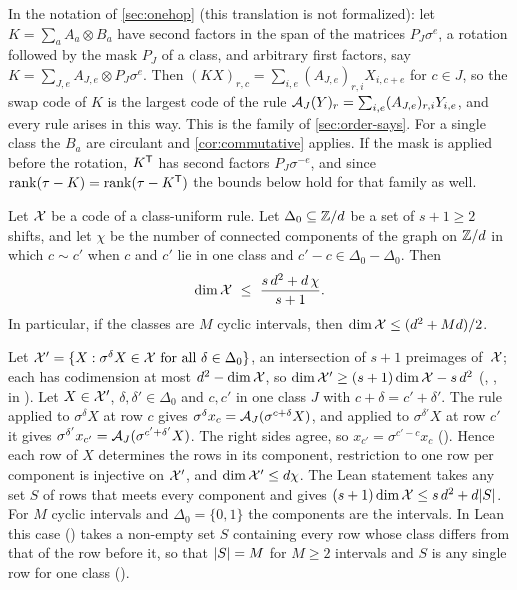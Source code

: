 In the notation of \cref{sec:onehop} (this translation is not formalized): let $K=\sum_aA_a\otimes B_a$ have second
factors in the span of the matrices $P_J\sigma^e$, a rotation followed by the mask $P_J$ of a class, and arbitrary first
factors, say $K=\sum_{J,e}A_{J,e}\otimes P_J\sigma^e$. Then $(KX)_{r,c}=\sum_{i,e}(A_{J,e})_{r,i}X_{i,c+e}$ for $c\in J$,
so the swap code of $K$ is the largest code of the rule $\mathcal{A}_J(Y)_r=\sum_{i,e}(A_{J,e})_{r,i}Y_{i,e}$, and every rule
arises in this way. This is the family of \cref{sec:order-says}. For a single class the $B_a$ are circulant and
\cref{cor:commutative} applies. If the mask is applied before the rotation, $K^{\mathsf{T}}$ has second factors
$P_J\sigma^{-e}$, and since $\operatorname{rank}(\tau-K)=\operatorname{rank}(\tau-K^{\mathsf{T}})$ the bounds below hold for that family as well.

\begin{theorem}\label{thm:TP}
Let $\mathcal{X}$ be a code of a class-uniform rule. Let $\Delta_0\subseteq\mathbb{Z}/d$ be a set of $s+1\ge2$ shifts, and let $\chi$
be the number of connected components of the graph on $\mathbb{Z}/d$ in which $c\sim c'$ when $c$ and $c'$ lie in one class and
$c'-c\in\Delta_0-\Delta_0$. Then
\[
  \dim\X\ \le\ \frac{s\,d^2+d\,\chi}{s+1}.
\]
In particular, if the classes are $M$ cyclic intervals, then $\dim\mathcal{X}\le(d^2+Md)/2$.
\end{theorem}

\begin{outline}
Let $\mathcal{X}'=\{X:\sigma^\delta X\in\mathcal{X}\text{ for all }\delta\in\Delta_0\}$, an intersection of $s+1$ preimages of~$\mathcal{X}$;
each has codimension at most $d^2-\dim\mathcal{X}$, so $\dim\mathcal{X}'\ge(s+1)\dim\mathcal{X}-s\,d^2$
(, , in
). Let $X\in\mathcal{X}'$, $\delta,\delta'\in\Delta_0$ and $c,c'$ in one class $J$
with $c+\delta=c'+\delta'$. The rule applied to $\sigma^\delta X$ at row $c$ gives
$\sigma^\delta x_c=\mathcal{A}_J(\sigma^{c+\delta}X)$, and applied to $\sigma^{\delta'}X$ at row $c'$ it gives
$\sigma^{\delta'}x_{c'}=\mathcal{A}_J(\sigma^{c'+\delta'}X)$. The right sides agree, so $x_{c'}=\sigma^{c'-c}x_c$
(). Hence each row of $X$ determines the rows in its component, restriction
to one row per component is injective on $\mathcal{X}'$, and $\dim\mathcal{X}'\le d\chi$. The Lean statement takes any set $S$ of rows
that meets every component and gives $(s+1)\dim\mathcal{X}\le s\,d^2+d\lvert S \rvert$. For $M$ cyclic intervals and $\Delta_0=\{0,1\}$ the components are the intervals. In Lean this case
() takes a non-empty set $S$ containing every row whose class differs from
that of the row before it, so that $\lvert S \rvert=M$ for $M\ge2$ intervals and $S$ is any single row for one class
().
\end{outline}


